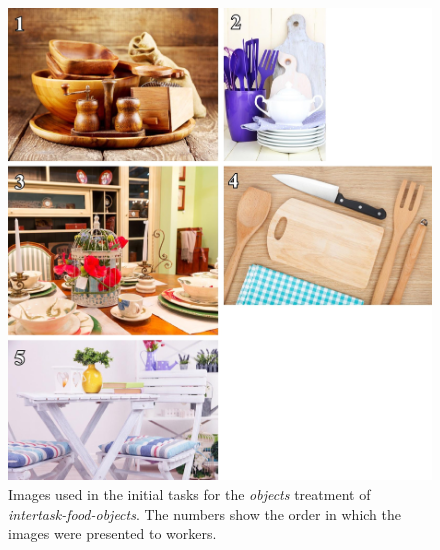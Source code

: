 \documentclass{sigchi}
\begin{document}
\begin{figure}
	\begin{center}
	\includegraphics{figs/task1-obj.jpg}
	\end{center}
	\caption{
		Images used in the initial tasks for the
		\textit{objects} treatment of \textit{intertask-food-objects}.  
		The numbers show the order in which the images were presented to 
		workers.
	}
	\label{fig:task1:obj}
\end{figure}
\end{document}
